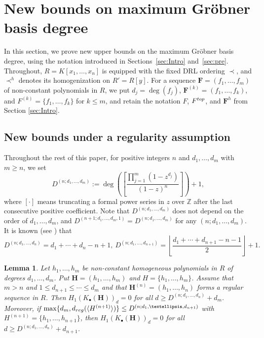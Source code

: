 \documentclass{article}
\newtheorem{lemma}[theorem]{Lemma}
\theoremstyle{definition}
\theoremstyle{plain}
\theoremstyle{plain}
\theoremstyle{plain}
\theoremstyle{plain}
\numberwithin{equation}{subsection}
\begin{document}
\section{New bounds on maximum Gr\"{o}bner basis degree}\label{sec:3}

In this section, we prove new upper bounds on the maximum Gr\"obner basis degree, using the notation introduced in Sections~\ref{sec:Intro} and~\ref{sec:pre}.
Throughout, $R=K[x_1,\ldots,x_n]$ is equipped with the fixed DRL ordering $\prec$, and $\prec^h$ denotes its homogenization on $R'=R[y]$.
For a sequence $\bm F=(f_1,\ldots,f_m)$ of non-constant polynomials in $R$, we put $d_j=\deg(f_j)$, $\bm F^{(k)}=(f_1,\ldots,f_k)$, and $F^{(k)}=\{f_1,\ldots,f_k\}$ for $k\le m$, and retain the notation $F$, $F^{\rm top}$, and $\bm F^h$ from Section \ref{sec:Intro}.

\subsection{New bounds under a regularity assumption}\label{sec:main}

Throughout the rest of this paper, for positive integers $n$ and $d_1,\ldots,d_m$ with $m \geq n$, we set
\begin{equation}\label{eq:newbound0}
  D^{(n;d_1,\ldots,d_m)}
  := \deg\!\left(\left[\frac{\prod_{j=1}^m (1-z^{d_j})}{(1-z)^n}\right]\right) + 1 ,
\end{equation}
where $[\cdot]$ means truncating a formal power series in $z$ over $\mathbb{Z}$ after the last consecutive positive coefficient.
Note that $D^{(n;d_1,\ldots,d_m)}$ does not depend on the order of $d_1,\ldots,d_m$, and $D^{(n+1;d_1,\ldots,d_m,1)} = D^{(n;d_1,\ldots,d_m)}$ for any $(n;d_1,\ldots,d_m)$.
It is known (see \cite[Lemma 2.5]{MM}) that
\[
D^{(n;d_1,\ldots,d_n)}=d_1+\cdots +d_n-n+1, \ 
D^{(n;d_1,\ldots,d_{n+1})}=\left\lfloor \frac{d_1+\cdots+d_{n+1}-n-1}{2}\right\rfloor+1.
\]

\begin{lemma}\label{lem:key}
Let $h_1,\ldots,h_m$ be non-constant homogeneous polynomials in $R$ of degrees $d_1,\ldots,d_m$.
Put $\bm{H} = (h_1,\ldots,h_m)$ and $H = \{ h_1,\ldots,h_m\}$.
Assume that $m>n$ and $1\le d_{n+1}\le\cdots\le d_m$ and that $\bm{H}^{(n)}=(h_1,\ldots,h_n)$ forms a regular sequence in $R$.
Then $H_1(K_\bullet(\bm{H}))_d=0$ for all $d\ge D^{(n;d_1,\ldots,d_n)}+d_m$.
Moreover, if $\max\{d_m, d_{\rm reg}(\langle H^{(n+1)}\rangle)\}\le D^{(n;d_1,\ldots,d_{n+1})}$ with $H^{(n+1)}=\{h_1,\ldots,h_{n+1}\}$, then $H_1(K_\bullet(\bm{H}))_d=0$ for all $d\ge D^{(n;d_1,\ldots,d_{n})}+d_{n+1}$.
\end{lemma}
\end{document}

